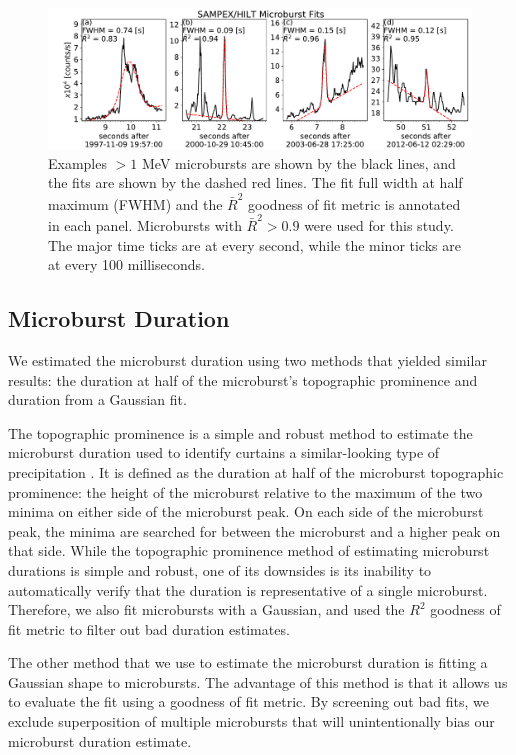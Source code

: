 \documentclass[draft]{agujournal2019}
\begin{document}
\begin{figure}
\noindent\includegraphics[width=\textwidth]{figures/fig1.pdf}
\caption{Examples $>1$ MeV microbursts are shown by the black lines, and the fits are shown by the dashed red lines. The fit full width at half maximum (FWHM) and the $\bar{R}^2$ goodness of fit metric is annotated in each panel. Microbursts with $\bar{R}^2 > 0.9$ were used for this study. The major time ticks are at every second, while the minor ticks are at every 100 milliseconds.}
\label{fig1}
\end{figure}

\subsection{Microburst Duration}
We estimated the microburst duration using two methods that yielded similar results: the duration at half of the microburst's topographic prominence and duration from a Gaussian fit.

The topographic prominence is a simple and robust method to estimate the microburst duration used to identify curtains a similar-looking type of precipitation \cite{Shumko2020b}. It is defined as the duration at half of the microburst topographic prominence: the height of the microburst relative to the maximum of the two minima on either side of the microburst peak. On each side of the microburst peak, the minima are searched for between the microburst and a higher peak on that side. While the topographic prominence method of estimating microburst durations is simple and robust, one of its downsides is its inability to automatically verify that the duration is representative of a single microburst. Therefore, we also fit microbursts with a Gaussian, and used the $R^2$ goodness of fit metric to filter out bad duration estimates.

The other method that we use to estimate the microburst duration is fitting a Gaussian shape to microbursts. The advantage of this method is that it allows us to evaluate the fit using a goodness of fit metric. By screening out bad fits, we exclude superposition of multiple microbursts that will unintentionally bias our microburst duration estimate.
\end{document}
